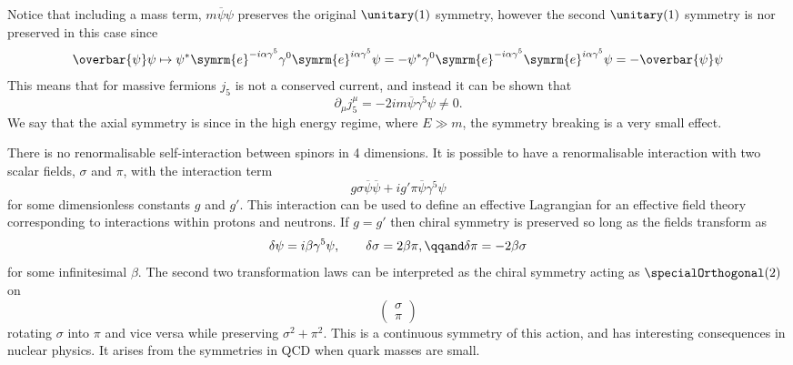 \documentclass[fleqn]{NotesClass}
\newcommand{\e}{\symrm{e}}
\newcommand{\diracadjoint}[1]{\overbar{#1}}
\begin{document}
    Notice that including a mass term, \(m\diracadjoint{\psi}\psi\) preserves the original \(\unitary(1)\) symmetry, however the second \(\unitary(1)\) symmetry is nor preserved in this case since
    \begin{equation}
        \diracadjoint{\psi} \psi \mapsto \psi^* \e^{-i\alpha\gamma^5} \gamma^0 \e^{i\alpha\gamma^5} \psi = -\psi^* \gamma^0 \e^{-i\alpha\gamma^5} \e^{i\alpha\gamma^5} \psi = -\diracadjoint{\psi}\psi
    \end{equation}
    This means that for massive fermions \(j_5\) is not a conserved current, and instead it can be shown that
    \begin{equation}
        \partial_\mu j_5^\mu = -2im\diracadjoint{\psi} \gamma^5 \psi \ne 0.
    \end{equation}
    We say that the axial symmetry is  since in the high energy regime, where \(E \gg m\), the symmetry breaking is a very small effect.
    
    There is no renormalisable self-interaction between spinors in 4 dimensions.
    It is possible to have a renormalisable interaction with two scalar fields, \(\sigma\) and \(\pi\), with the interaction term
    \begin{equation}
        g \sigma \diracadjoint{\psi}\diracadjoint{\psi} + ig' \pi \diracadjoint{\psi} \gamma^5 \psi
    \end{equation}
    for some dimensionless constants \(g\) and \(g'\).
    This interaction can be used to define an effective Lagrangian for an effective field theory corresponding to interactions within protons and neutrons.
    If \(g = g'\) then chiral symmetry is preserved so long as the fields transform as
    \begin{equation}
        \delta\psi = i\beta\gamma^5\psi, \qquad \delta \sigma = 2\beta \pi, \qqand \delta \pi = -2\beta \sigma
    \end{equation}
    for some infinitesimal \(\beta\).
    The second two transformation laws can be interpreted as the chiral symmetry acting as \(\specialOrthogonal(2)\) on
    \begin{equation}
        \begin{pmatrix}
            \sigma\\ \pi
        \end{pmatrix}
    \end{equation}
    rotating \(\sigma\) into \(\pi\) and vice versa while preserving \(\sigma^2 + \pi^2\).
    This is a continuous symmetry of this action, and has interesting consequences in nuclear physics.
    It arises from the symmetries in QCD when quark masses are small.
    
\end{document}
